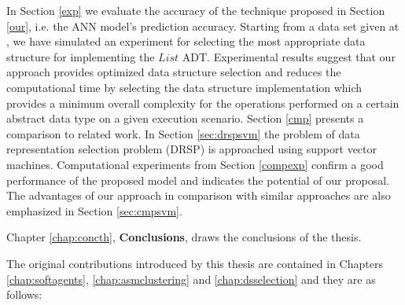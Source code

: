 In Section \ref{exp} we evaluate the accuracy of the technique proposed in Section \ref{our}, i.e. the ANN model's prediction accuracy. Starting from a data set given at \cite{forina}, we have simulated an experiment for selecting the most appropriate data structure for implementing the $List$ ADT. Experimental results suggest that our approach provides optimized data structure selection and reduces the computational time by selecting the data structure implementation which provides a minimum overall complexity for the operations performed on a certain abstract data type on a given execution scenario. Section \ref{cmp} presents a comparison to related work.
In Section \ref{sec:drspsvm} the problem of data representation selection problem (DRSP) is approached using support vector machines. Computational experiments from Section \ref{compexp} confirm a good performance of the proposed model and indicates the potential of our proposal. The advantages of our approach in comparison with similar approaches are also emphasized in Section \ref{sec:cmpsvm}.  

Chapter \ref{chap:concth}, \textbf{Conclusions}, draws the conclusions of the thesis.

The original contributions introduced by this thesis are contained in Chapters \ref{chap:softagents}, \ref{chap:asmclustering} and \ref{chap:dsselection}  and they are as follows:

